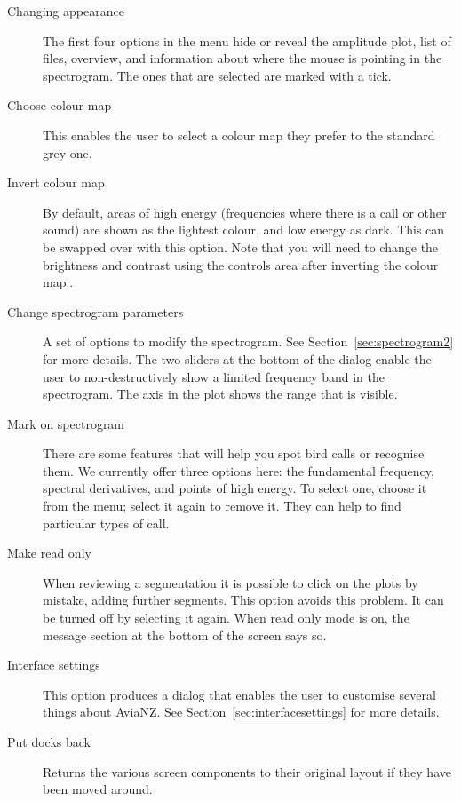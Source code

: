 \documentclass{article}
\begin{document}
\begin{description}
\item [Changing appearance] The first four options in the menu hide or reveal the amplitude plot, list of files, overview, and information about where the mouse is pointing in the spectrogram. The ones that are selected are marked with a tick. 
\item [Choose colour map] This enables the user to select a colour map they prefer to the standard grey one. 
\item [Invert colour map] By default, areas of high energy (frequencies where there is a call or other sound) are shown as the lightest colour, and low energy as dark. This can be swapped over with this option. Note that you will need to change the brightness and contrast using the controls area after inverting the colour map.. 
\item [Change spectrogram parameters] A set of options to modify the spectrogram.  See Section~\ref{sec:spectrogram2} for more details. %
The two sliders at the bottom of the dialog enable the user to non-destructively show a limited frequency band in the spectrogram. The axis in the plot shows the range that is visible. 
\item [Mark on spectrogram] There are some features that will help you spot bird calls or recognise them. We currently offer three options here: the fundamental frequency, spectral derivatives, and points of high energy. To select one, choose it from the menu; select it again to remove it. They can help to find particular types of call. 
\item [Make read only] When reviewing a segmentation it is possible to click on the plots by mistake, adding further segments. This option avoids this problem. It can be turned off by selecting it again. When read only mode is on, the message section at the bottom of the screen says so. 
\item [Interface settings] This option produces a dialog that enables the user to customise several things about AviaNZ. See Section~\ref{sec:interfacesettings} for more details.
\item [Put docks back] Returns the various screen components to their original layout if they have been moved around. 
\end{description}
\end{document}
